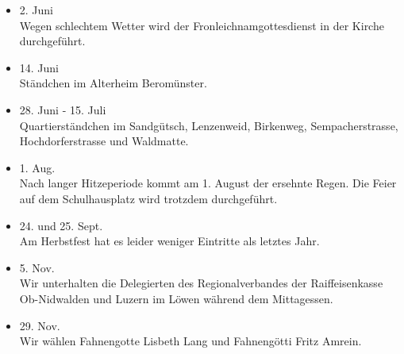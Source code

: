 \begin{multicols}{2}
\begin{itemize}
        \item[]2. Juni\\
        Wegen schlechtem Wetter wird der Fronleichnamgottesdienst in der Kirche
        durchgeführt.

        \item[]14. Juni\\
        Ständchen im Alterheim Beromünster.

        \item[]28. Juni - 15. Juli\\
        Quartierständchen im Sandgütsch, Lenzenweid, Birkenweg,
        Sempacherstrasse, Hochdorferstrasse und Waldmatte.

        \item[]1. Aug.\\
        Nach langer Hitzeperiode kommt am 1. August der ersehnte Regen. Die
        Feier auf dem Schulhausplatz wird trotzdem durchgeführt.

        \item[]24. und 25. Sept.\\
        Am Herbstfest hat es leider weniger Eintritte als letztes Jahr.

        \item[]5. Nov.\\
        Wir unterhalten die Delegierten des Regionalverbandes der
        Raiffeisenkasse Ob-Nidwalden und Luzern im Löwen während dem
        Mittagessen.

        \item[]29. Nov.\\
        Wir wählen Fahnengotte Lisbeth Lang und Fahnengötti Fritz Amrein.

    \end{itemize}

\end{multicols}
